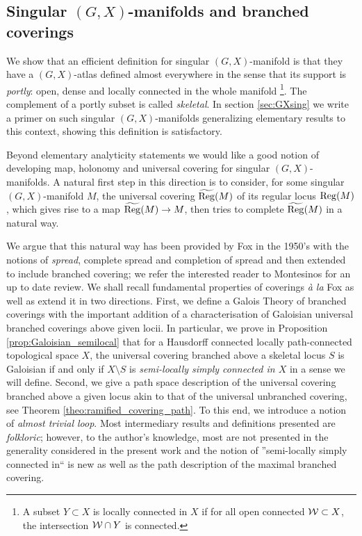 \subsection{Singular $(G,X)$-manifolds and branched coverings}

We show that an efficient definition for singular $(G,X)$-manifold is that they have a $(G,X)$-atlas defined almost everywhere in the sense that its support is {\it portly}: open, dense and locally connected in the whole manifold \footnote{A subset $Y\subset X$ is locally connected in $X$ if for all open connected $\mathcal W\subset X$, the intersection $\mathcal W\cap Y$ is connected. }. The complement of a portly subset is called  {\it skeletal}.  In section \ref{sec:GXsing} we write a primer on such singular $(G,X)$-manifolds generalizing elementary results to this context,  showing this definition is satisfactory. 

Beyond elementary analyticity statements we would like a good notion of developing map, holonomy and universal covering for singular $(G,X)$-manifolds.  
A natural first step in this direction is to consider, for some singular $(G,X)$-manifold $M$, the universal covering $\widetilde{\mathrm{Reg}}(M)$ of its regular locus $\mathrm{Reg}(M)$, which gives rise to a map $\widetilde{\mathrm{Reg}}(M)\rightarrow M$, then tries to complete $\widetilde{\mathrm{Reg}}(M)$ in a natural way.  

We argue that this natural way has been provided by Fox in the 1950's \cite{MR0123298,MR1152367} with the notions of {\it spread}, complete spread and completion of spread and then extended to include branched covering; we refer the interested reader to Montesinos \cite{MR3060537} for an up to date review. We shall recall fundamental properties of coverings {\it à la} Fox as well as extend it in two directions. First, we define a Galois Theory of branched coverings  with  the important addition of a characterisation of Galoisian universal branched coverings above given locii. In particular, we prove in Proposition \ref{prop:Galoisian_semilocal} that for a Hausdorff connected locally path-connected topological space $X$, the universal covering branched  above a skeletal
locus $S$ is Galoisian if and only if $X\setminus S$ is {\it semi-locally simply connected in $X$} in a sense we will define. 
Second, we give a path space description of the universal covering branched above a given locus akin to that of the universal unbranched covering, see Theorem \ref{theo:ramified_covering_path}. To this end, we introduce a notion of {\it almost trivial loop}. 
Most intermediary results and definitions presented are {\it folkloric}; however, to the author's knowledge, most are not presented in the generality considered in the present work and the notion of ''semi-locally simply connected in`` is new as well as the path description of the maximal branched covering.

